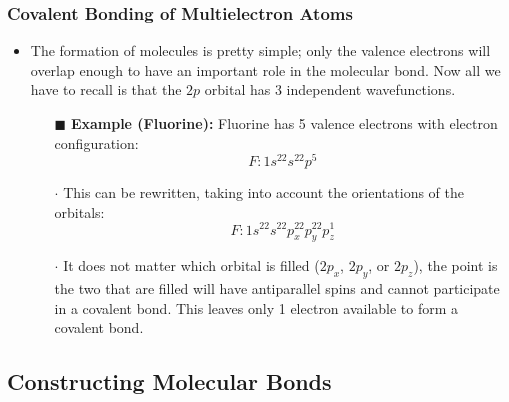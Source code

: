 \documentclass[12pt, letterpaper, twoside]{article}
\begin{document}
\subsubsection{Covalent Bonding of Multielectron Atoms}
\begin{itemize}
    \item The formation of molecules is pretty simple; only the valence electrons will overlap enough to have an important role in the molecular bond. Now all we have to recall is that the $2p$ orbital has 3 independent wavefunctions.
    \begin{itemize}
        \item[$\blacksquare$] \textbf{Example (Fluorine):} Fluorine has 5 valence electrons with electron configuration:
        \begin{equation*}
            F: 1s^22s^22p^5
        \end{equation*}
        \item[$\cdot$] This can be rewritten, taking into account the orientations of the orbitals:
        \begin{equation*}
            F: 1s^22s^22p_x^22p_y^22p_z^1
        \end{equation*}
        \item[$\cdot$] It does not matter which orbital is filled ($2p_x$, $2p_y$, or $2p_z$), the point is the two that are filled will have antiparallel spins and cannot participate in a covalent bond. This leaves only 1 electron available to form a covalent bond.
    \end{itemize}
\end{itemize}
\subsection{Constructing Molecular Bonds}
\end{document}
